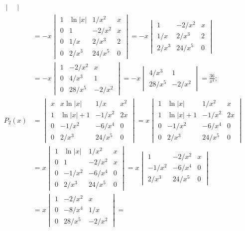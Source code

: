 \documentclass[openany]{book}
\newenvironment{sectionSolutions}{
 \begin{enumerate}[item-label={\thesection.\arabic{enumi}.}]
}{
 \end{enumerate}
}
\begin{document}
\begin{sectionSolutions}
\begin{alist}
\begin{align*}
\begin{vmatrix}
\end{vmatrix}\\
&=-x\begin{vmatrix}
1&\ln|x|&1/x^2&x\\
0&1&-2/x^2&x\\
0&1/x&2/x^3&2\\
0&2/x^3&24/x^5&0
\end{vmatrix}
=-x\begin{vmatrix}
1&-2/x^2&x\\
1/x&2/x^3&2\\
2/x^3&24/x^5&0
\end{vmatrix}\\
&=-x\begin{vmatrix}
1&-2/x^2&x\\
0&4/x^3&1\\
0&28/x^5&-2/x^2
\end{vmatrix}
=-x\begin{vmatrix}
4/x^3&1\\
28/x^5&-2/x^2
\end{vmatrix}=\frac{36}{ x^4};\\
P_2(x)&=
\begin{vmatrix}
x&x\ln|x|&1/x&x^2\\
1&\ln|x|+1&-1/x^2&2x\\
0&-1/x^2&-6/x^4&0\\
0&2/x^3&24/x^5&0
\end{vmatrix}=
x\begin{vmatrix}
1&\ln|x|&1/x^2&x\\
1&\ln|x|+1&-1/x^2&2x\\
0&-1/x^2&-6/x^4&0\\
0&2/x^3&24/x^5&0
\end{vmatrix}\\
&=x\begin{vmatrix}
1&\ln|x|&1/x^2&x\\
0&1&-2/x^2&x\\
0&-1/x^2&-6/x^4&0\\
0&2/x^3&24/x^5&0
\end{vmatrix}=
x\begin{vmatrix}
1&-2/x^2&x\\
-1/x^2&-6/x^4&0\\
2/x^3&24/x^5&0
\end{vmatrix}\\
&=x\begin{vmatrix}
1&-2/x^2&x\\
0&-8/x^4&1/x\\
0&28/x^5&-2/x^2
\end{vmatrix}=

\end{align*}
\end{alist}
\end{sectionSolutions}
\end{document}
